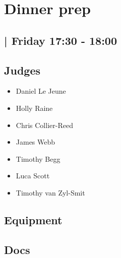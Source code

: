 \documentclass[10pt]{article}
\begin{document}
		\begin{minipage}{\linewidth}
		\setcounter{section}{3}
	\section{Dinner prep }
	\subsection*{ | Friday 17:30 - 18:00}

	

	\begin{multicols}{2}
	\subsection*{\faUsers \: Judges}
	\begin{itemize}
			\item Daniel Le Jeune
			\item Holly Raine
			\item Chris Collier-Reed
			\item James Webb
			\item Timothy Begg
			\item Luca Scott
			\item Timothy van Zyl-Smit
		\end{itemize}
	\columnbreak
	\subsection*{\faWrench \: Equipment}
	        \vfill\null
        \subsection*{\faFile \: Docs}
     	\end{multicols}


	\vspace{1cm}
	\end{minipage}
\end{document}
